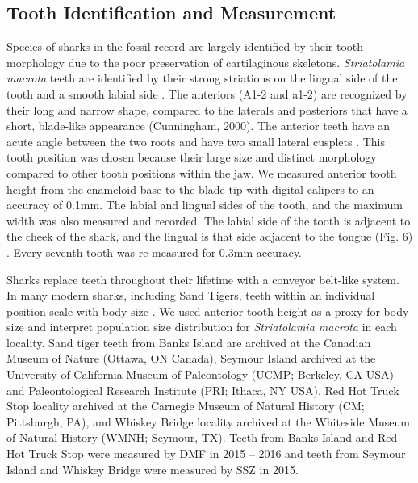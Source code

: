 \documentclass[]{rsos}%
\begin{document}

\subsection{Tooth Identification and Measurement}
Species of sharks in the fossil record are largely identified by their tooth morphology \cite{Cappetta2012} due to the poor preservation of cartilaginous skeletons. 
\emph{Striatolamia macrota} teeth are identified by their strong striations on the lingual side of the tooth and a smooth labial side \cite{Cappetta2012}. 
The anteriors (A1-2 and a1-2) are recognized by their long and narrow shape, compared to the laterals and posteriors that have a short, blade-like appearance (Cunningham, 2000). 
The anterior teeth have an acute angle between the two roots and have two small lateral cusplets \cite{Padilla2014, Cappetta2012}. 
This tooth position was chosen because their large size and distinct morphology compared to other tooth positions within the jaw. 
We measured anterior tooth height from the enameloid base to the blade tip with digital calipers to an accuracy of 0.1mm. 
The labial and lingual sides of the tooth, and the maximum width was also measured and recorded. 
The labial side of the tooth is adjacent to the cheek of the shark, and the lingual is that side adjacent to the tongue (Fig. 6) \cite{Cappetta2012}.  
Every seventh tooth was re-measured for 0.3mm accuracy. 

Sharks replace teeth throughout their lifetime with a conveyor belt-like system. 
In many modern sharks, including Sand Tigers, teeth within an individual position scale with body size \cite{Shimada2002, Shimada2004, Shimada2007, Shimada2020}. 
We used anterior tooth height as a proxy for body size and interpret population size distribution for \emph{Striatolamia macrota} in each locality. 
Sand tiger teeth from Banks Island are archived at the Canadian Museum of Nature (Ottawa, ON Canada), Seymour Island archived at the University of California Museum of Paleontology (UCMP; Berkeley, CA USA) and Paleontological Research Institute (PRI; Ithaca, NY USA), Red Hot Truck Stop locality archived at the Carnegie Museum of Natural History (CM; Pittsburgh, PA), and Whiskey Bridge locality archived at the Whiteside Museum of Natural History (WMNH; Seymour, TX). 
Teeth from Banks Island and Red Hot Truck Stop were measured by DMF in 2015 – 2016 and teeth from Seymour Island and Whiskey Bridge were measured by SSZ in 2015. 
\end{document}
